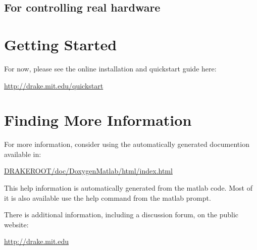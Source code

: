 \subsection{For controlling real hardware}

\section{Getting Started}

For now, please see the online installation and quickstart guide here:

\centerline{\url{http://drake.mit.edu/quickstart}}

\section{Finding More Information}

For more information, consider using the automatically generated documention available in:

\centerline{\url{DRAKEROOT/doc/DoxygenMatlab/html/index.html}}

\smallskip\noindent
This help information is automatically generated from the matlab code.  Most of it is also available use the help command from the matlab prompt.

There is additional information, including a discussion forum, on the public website:

\centerline{\url{http://drake.mit.edu}}

